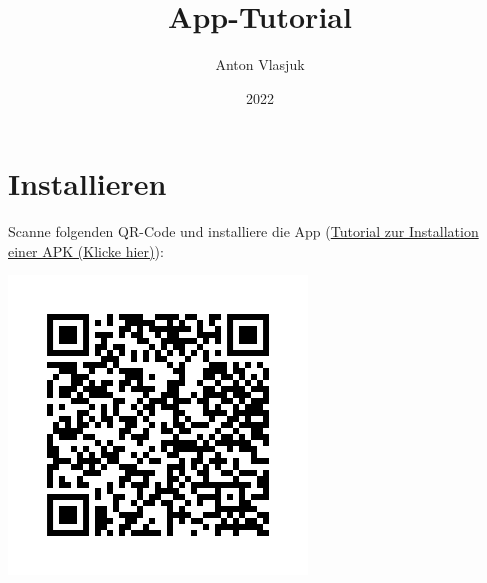 \documentclass[ngerman]{tutorial}
\title{App-Tutorial}
\author{Anton Vlasjuk}
\date{2022}
\begin{document}
\maketitle
\tableofcontents

\clearpage

\uulmlogo

\section{Installieren}
Scanne folgenden QR-Code und installiere die App (\href{https://www.heise.de/tipps-tricks/Externe-Apps-APK-Dateien-bei-Android-installieren-so-klappt-s-3714330.html}{Tutorial zur Installation einer APK (Klicke hier)}):
\vfill
\begin{center}
    \includegraphics[scale=0.6]{frame.png}
\end{center}
\vfill
\newpage
\end{document}

